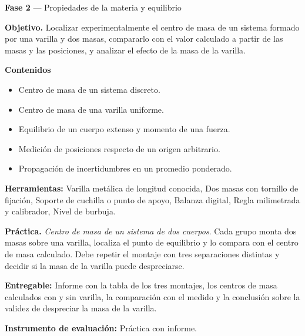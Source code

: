 \documentclass[11pt,a4paper]{article}
\begin{document}
\begin{tcolorbox}[cajaContenido,title={Semana 7 --- Centro de masa de un sistema de dos cuerpos}]
\textbf{Fase 2} --- Propiedades de la materia y equilibrio

\textbf{Objetivo.} Localizar experimentalmente el centro de masa de un sistema formado por una varilla y dos masas, compararlo con el valor calculado a partir de las masas y las posiciones, y analizar el efecto de la masa de la varilla.

\textbf{Contenidos}

\begin{itemize}[leftmargin=1.4em,itemsep=2pt,topsep=3pt]
  \item Centro de masa de un sistema discreto.
  \item Centro de masa de una varilla uniforme.
  \item Equilibrio de un cuerpo extenso y momento de una fuerza.
  \item Medición de posiciones respecto de un origen arbitrario.
  \item Propagación de incertidumbres en un promedio ponderado.
\end{itemize}

\textbf{Herramientas:} Varilla metálica de longitud conocida, Dos masas con tornillo de fijación, Soporte de cuchilla o punto de apoyo, Balanza digital, Regla milimetrada y calibrador, Nivel de burbuja.

\textbf{Práctica.} \emph{Centro de masa de un sistema de dos cuerpos}. Cada grupo monta dos masas sobre una varilla, localiza el punto de equilibrio y lo compara con el centro de masa calculado. Debe repetir el montaje con tres separaciones distintas y decidir si la masa de la varilla puede despreciarse.

\textbf{Entregable:} Informe con la tabla de los tres montajes, los centros de masa calculados con y sin varilla, la comparación con el medido y la conclusión sobre la validez de despreciar la masa de la varilla.

\textbf{Instrumento de evaluación:} Práctica con informe.
\end{tcolorbox}
\end{document}
